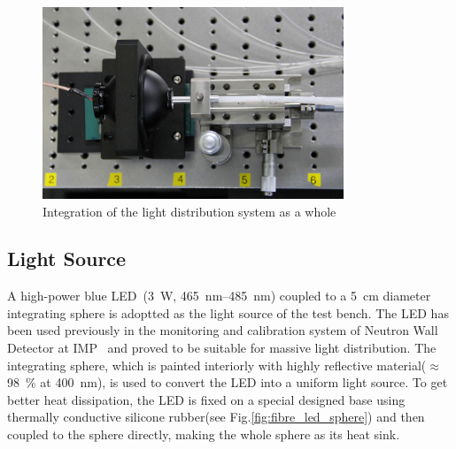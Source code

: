 \documentclass[5p, times]{elsarticle}
\begin{document}
\begin{figure}
 \centering
 \includegraphics[width=90mm]{light_source1_crop}
\caption{Integration of the light distribution system as a whole}
\label{fig:light_source}
\end{figure} 

\subsection{Light Source}
\label{sec:light_source}

A high-power blue LED~\cite{zlight}(\SI{3}{\watt}, \SIrange{465}{485}{\nano\meter}) coupled to a \SI{5}{\centi\meter} diameter integrating sphere is adoptted as the light source of the test bench.
The LED has been used previously in the monitoring and calibration system of Neutron Wall Detector at IMP~\cite{yuyuhong_led} and proved to be suitable for massive light distribution.
The integrating sphere, which is painted interiorly with highly reflective material($\approx$\SI{98}{\percent} at \SI{400}{\nano\meter}), is used to convert the LED into a uniform light source.
To get better heat dissipation, the LED is fixed on a special designed base using thermally conductive silicone rubber(see Fig.\ref{fig:fibre_led_sphere}) and then coupled to the sphere directly, making the whole sphere as its heat sink.

\end{document}
